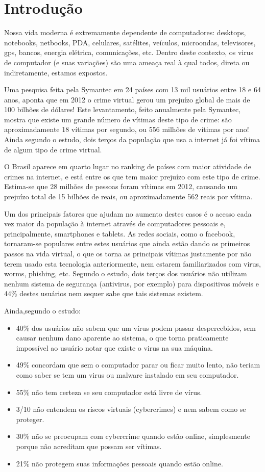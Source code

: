\chapter{Introdução}

Nossa vida moderna é extremamente dependente de computadores: desktops, notebooks, netbooks, PDA, celulares, satélites, veículos, microondas, televisores, gps, bancos, energia elétrica, comunicações, etc. Dentro deste contexto, os virus de computador (e suas variações) são uma ameaça real à qual todos, direta ou indiretamente, estamos expostos.

Uma pesquisa feita pela Symantec\cite{symantec:7,symantec:8} em 24 países com 13 mil usuários entre 18 e 64 anos, aponta que em 2012 o crime virtual gerou um prejuízo global de mais de 100 bilhões de dólares! Este levantamento, feito anualmente pela Symantec, mostra que existe um grande número de vítimas deste tipo de crime: são aproximadamente 18 vítimas por segundo, ou 556 milhões de vítimas por ano! Ainda segundo o estudo, dois terços da população que usa a internet já foi vítima de algum tipo de crime virtual.

O Brasil aparece em quarto lugar no ranking de países com maior atividade de crimes na internet\cite{uolnoticia:1}, e está entre os que tem maior prejuízo com este tipo de crime. Estima-se que 28 milhões de pessoas foram vítimas em 2012, causando um prejuízo total de 15 bilhões de reais, ou aproximadamente 562 reais por vítima.

Um dos principais fatores que ajudam no aumento destes casos é o acesso cada vez maior da população à internet através de computadores pessoais e, principalmente, smartphones e tablets. As redes sociais, como o facebook, tornaram-se populares entre estes usuários que ainda estão dando os primeiros passos na vida virtual, o que os torna as principais vítimas justamente por não terem usado esta tecnologia anteriormente, nem estarem familiarizados com virus, worms, phishing, etc. Segundo o estudo, dois terços dos usuários não utilizam nenhum sistema de segurança (antivirus, por exemplo) para dispositivos móveis e 44\% destes usuários nem sequer sabe que tais sistemas existem.

Ainda,segundo o estudo:
\begin{itemize}
\item 40\% dos usuários não sabem que um vírus podem passar despercebidos, sem causar nenhum dano aparente ao sistema, o que torna praticamente impossível ao usuário notar que existe o virus na sua máquina. 
\item 49\% concordam que sem o computador parar ou ficar muito lento, não teriam como saber se tem um virus ou malware instalado em seu computador. 
\item 55\% não tem certeza se seu computador está livre de vírus.
\item 3/10 não entendem os riscos virtuais (cybercrimes) e nem sabem como se proteger.
\item 30\% não se preocupam com cybercrime quando estão online, simplesmente porque não acreditam que possam ser vítimas.
\item 21\% não protegem suas informações pessoais quando estão online.
\end{itemize}

